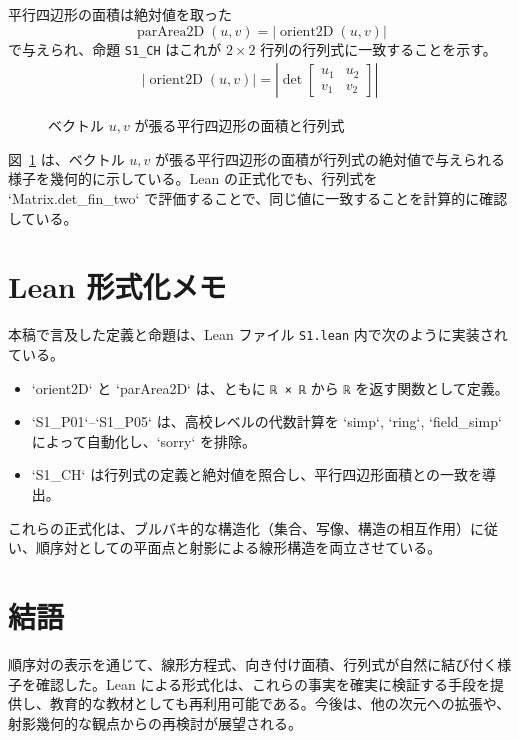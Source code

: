 \documentclass[12pt]{ltjsarticle}
\begin{document}
平行四辺形の面積は絶対値を取った
\begin{equation}
 \operatorname{parArea2D}(u,v) = \left|\operatorname{orient2D}(u,v)\right|
\end{equation}
で与えられ、命題 \texttt{S1\_CH} はこれが $2 \times 2$ 行列の行列式に一致することを示す。
\begin{align}
 \left|\operatorname{orient2D}(u,v)\right| = \left|\det \begin{bmatrix} u_1 & u_2 \\ v_1 & v_2 \end{bmatrix} \right|
\end{align}

\begin{figure}[htbp]
 \centering
 \caption{ベクトル $u,v$ が張る平行四辺形の面積と行列式}
 \label{fig:parallelogram}
\end{figure}

図~\ref{fig:parallelogram} は、ベクトル $u,v$ が張る平行四辺形の面積が行列式の絶対値で与えられる様子を幾何的に示している。Lean の正式化でも、行列式を `Matrix.det_fin_two` で評価することで、同じ値に一致することを計算的に確認している。

\section{Lean 形式化メモ}
本稿で言及した定義と命題は、Lean ファイル \texttt{S1.lean} 内で次のように実装されている。
\begin{itemize}
 \item `orient2D` と `parArea2D` は、ともに \texttt{ℝ × ℝ} から \texttt{ℝ} を返す関数として定義。
 \item `S1_P01`--`S1_P05` は、高校レベルの代数計算を `simp`, `ring`, `field_simp` によって自動化し、`sorry` を排除。
 \item `S1_CH` は行列式の定義と絶対値を照合し、平行四辺形面積との一致を導出。
\end{itemize}
これらの正式化は、ブルバキ的な構造化（集合、写像、構造の相互作用）に従い、順序対としての平面点と射影による線形構造を両立させている。

\section{結語}
順序対の表示を通じて、線形方程式、向き付け面積、行列式が自然に結び付く様子を確認した。Lean による形式化は、これらの事実を確実に検証する手段を提供し、教育的な教材としても再利用可能である。今後は、他の次元への拡張や、射影幾何的な観点からの再検討が展望される。
\end{document}
